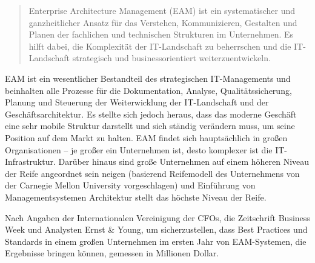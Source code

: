 \documentclass[
	A4paper,
	DIV=9,
	BCOR7mm,
	smallheadings,
	headinclude,
	footinclude,
	headsepline,
	parindent,
	german,
	captions=tableheading,
	abstracton
	]{scrreprt}
\begin{document}
\begin{quote}Enterprise Architecture Management (EAM) ist ein systematischer und ganzheitlicher Ansatz für das Verstehen, Kommunizieren, Gestalten und Planen der fachlichen und technischen Strukturen im Unternehmen. Es hilft dabei, die Komplexität der IT-Landschaft zu beherrschen und die IT-Landschaft strategisch und businessorientiert  weiterzuentwickeln. \autocite{Hanschke2016}
\end{quote}

EAM ist ein wesentlicher Bestandteil des strategischen IT-Managements und beinhalten alle Prozesse für die Dokumentation, Analyse, Qualitätssicherung, Planung und Steuerung der Weiterwicklung der IT-Landschaft und der Geschäftsarchitektur. Es stellte sich jedoch heraus, dass das moderne Geschäft eine sehr mobile Struktur darstellt und sich ständig verändern muss, um seine Position auf dem Markt zu halten. EAM findet sich hauptsächlich in großen Organisationen -- je großer ein Unternehmen ist, desto komplexer ist die IT-Infrastruktur. Darüber hinaus sind große Unternehmen auf einem höheren Niveau der Reife angeordnet sein neigen (basierend Reifemodell des Unternehmens von der Carnegie Mellon University vorgeschlagen) und Einführung von Managementsystemen Architektur stellt das höchste Niveau der Reife.

Nach Angaben der Internationalen Vereinigung der CFOs, die Zeitschrift Business Week und Analysten Ernst \& Young, um sicherzustellen, dass Best Practices und Standards in einem großen Unternehmen im ersten Jahr von EAM-Systemen, die Ergebnisse bringen können, gemessen in Millionen Dollar.
\end{document}
